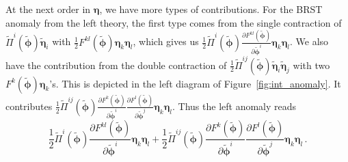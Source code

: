 \documentclass[11pt]{article}
\numberwithin{equation}{section}
\begin{document}
At the next order in $\boldsymbol{\eta}$, we have more types of contributions. For the BRST anomaly from the left theory, the first type comes from the single contraction of $\widetilde{\Pi}^i(\widetilde{\boldsymbol{\phi}})\widetilde{\boldsymbol{\eta}}_i$ with $\frac{1}{2}F^{kl}(\widetilde{\boldsymbol{\phi}})\boldsymbol{\eta}_k\boldsymbol{\eta}_l$, which gives us $\frac{1}{2}\widetilde{\Pi}^{i}(\widetilde{\boldsymbol{\phi}})\frac{\partial F^{kl}(\widetilde{\boldsymbol{\phi}})}{\partial \widetilde{\boldsymbol{\phi}}^i}\boldsymbol{\eta}_k\boldsymbol{\eta}_l$. We also have the contribution from the double contraction of $\frac{1}{2}\widetilde{\Pi}^{ij}(\widetilde{\boldsymbol{\phi}})\widetilde{\boldsymbol{\eta}}_i\widetilde{\boldsymbol{\eta}}_j$ with two $F^{k}(\widetilde{\boldsymbol{\phi}})\boldsymbol{\eta}_k$'s. This is depicted in the left diagram of Figure~\ref{fig:int_anomaly}. It contributes $\frac{1}{2}\widetilde{\Pi}^{ij}(\widetilde{\boldsymbol{\phi}})\frac{\partial F^k(\widetilde{\boldsymbol{\phi}})}{\partial \widetilde{\boldsymbol{\phi}}^i}\frac{\partial F^l(\widetilde{\boldsymbol{\phi}})}{\partial \widetilde{\boldsymbol{\phi}}^j}\boldsymbol{\eta}_k\boldsymbol{\eta}_l$. Thus the left anomaly reads
\begin{equation}
	\frac{1}{2}\widetilde{\Pi}^{i}(\widetilde{\boldsymbol{\phi}})\frac{\partial F^{kl}(\widetilde{\boldsymbol{\phi}})}{\partial \widetilde{\boldsymbol{\phi}}^i}\boldsymbol{\eta}_k\boldsymbol{\eta}_l + \frac{1}{2}\widetilde{\Pi}^{ij}(\widetilde{\boldsymbol{\phi}})\frac{\partial F^k(\widetilde{\boldsymbol{\phi}})}{\partial \widetilde{\boldsymbol{\phi}}^i}\frac{\partial F^l(\widetilde{\boldsymbol{\phi}})}{\partial \widetilde{\boldsymbol{\phi}}^j}\boldsymbol{\eta}_k\boldsymbol{\eta}_l\,.
\end{equation}
\end{document}
